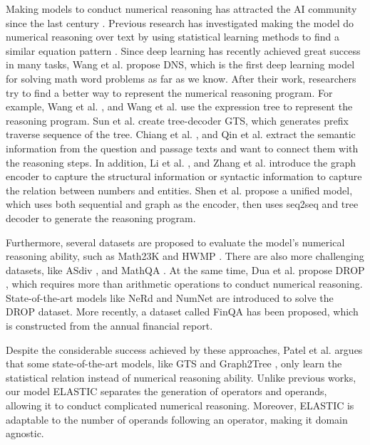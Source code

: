 \documentclass{article}
\begin{document}
Making models to conduct numerical reasoning has attracted the AI community since the last century \cite{ref_1}. Previous research has investigated making the model do numerical reasoning over text by using statistical learning methods to find a similar equation pattern \cite{ref_4, ref_5, ref_6, ref_7}. Since deep learning has recently achieved great success in many tasks, Wang et al. \cite{ref_8} propose DNS, which is the first deep learning model for solving math word problems as far as we know. After their work, researchers try to find a better way to represent the numerical reasoning program. For example, Wang et al. \cite{ref_9}, and Wang et al. \cite{ref_10} use the expression tree to represent the reasoning program. Sun et al. \cite{ref_11} create tree-decoder GTS, which generates prefix traverse sequence of the tree. Chiang et al. \cite{ref_12}, and Qin et al. \cite{ref_13} extract the semantic information from the question and passage texts and want to connect them with the reasoning steps. In addition, Li et al. \cite{ref_14}, and Zhang et al. \cite{ref_15} introduce the graph encoder to capture the structural information or syntactic information to capture the relation between numbers and entities. Shen et al. \cite{ref_16} propose a unified model, which uses both sequential and graph as the encoder, then uses seq2seq and tree decoder to generate the reasoning program. 

Furthermore, several datasets are proposed to evaluate the model's numerical reasoning ability, such as Math23K \cite{ref_17} and HWMP \cite{ref_13}. There are also more challenging datasets, like ASdiv \cite{ref_18}, and MathQA \cite{MathQA}. At the same time, Dua et al. propose DROP \cite{ref_19}, which requires more than arithmetic operations to conduct numerical reasoning. State-of-the-art models like NeRd \cite{NeRd} and NumNet \cite{NumNet} are introduced to solve the DROP dataset. More recently, a dataset called FinQA \cite{finqa} has been proposed, which is constructed from the annual financial report.

Despite the considerable success achieved by these approaches, Patel et al. \cite{ref_21} argues that some state-of-the-art models, like GTS \cite{ref_11} and Graph2Tree \cite{ref_15}, only learn the statistical relation instead of numerical reasoning ability. Unlike previous works, our model ELASTIC separates the generation of operators and operands, allowing it to conduct complicated numerical reasoning. Moreover, ELASTIC is adaptable to the number of operands following an operator, making it domain agnostic.
\end{document}
